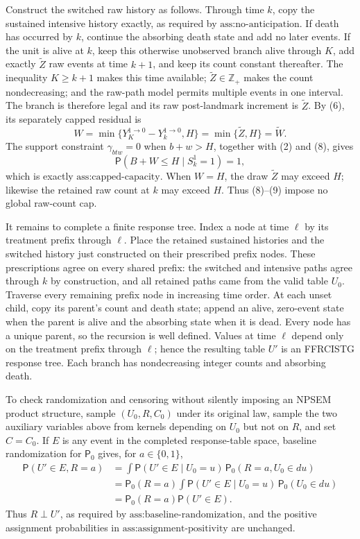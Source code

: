 Construct the switched raw history as follows. Through time \(k\), copy the sustained intensive history exactly, as required by \(\text{ass:no-anticipation}\). If death has occurred by \(k\), continue the absorbing death state and add no later events. If the unit is alive at \(k\), keep this otherwise unobserved branch alive through \(K\), add exactly \(\widetilde Z\) raw events at time \(k+1\), and keep its count constant thereafter. The inequality \(K\ge k+1\) makes this time available; \(\widetilde Z\in\mathbb Z_+\) makes the count nondecreasing; and the raw-path model permits multiple events in one interval. The branch is therefore legal and its raw post-landmark increment is \(\widetilde Z\). By (6), its separately capped residual is
\[
 W=\min\{Y_K^{1\to0}-Y_k^{1\to0},H\}
   =\min\{\widetilde Z,H\}=\widetilde W.                \tag{8}
\]
The support constraint \(\gamma_{btw}=0\) when \(b+w>H\), together with (2) and (8), gives
\[
 \mathsf P(B+W\le H\mid S_k^1=1)=1,                     \tag{9}
\]
which is exactly \(\text{ass:capped-capacity}\). When \(W=H\), the draw \(\widetilde Z\) may exceed \(H\); likewise the retained raw count at \(k\) may exceed \(H\). Thus (8)--(9) impose no global raw-count cap.

It remains to complete a finite response tree. Index a node at time \(\ell\) by its treatment prefix through \(\ell\). Place the retained sustained histories and the switched history just constructed on their prescribed prefix nodes. These prescriptions agree on every shared prefix: the switched and intensive paths agree through \(k\) by construction, and all retained paths came from the valid table \(U_0\). Traverse every remaining prefix node in increasing time order. At each unset child, copy its parent's count and death state; append an alive, zero-event state when the parent is alive and the absorbing state when it is dead. Every node has a unique parent, so the recursion is well defined. Values at time \(\ell\) depend only on the treatment prefix through \(\ell\); hence the resulting table \(U'\) is an FFRCISTG response tree. Each branch has nondecreasing integer counts and absorbing death.

To check randomization and censoring without silently imposing an NPSEM product structure, sample \((U_0,R,C_0)\) under its original law, sample the two auxiliary variables above from kernels depending on \(U_0\) but not on \(R\), and set \(C=C_0\). If \(E\) is any event in the completed response-table space, baseline randomization for \(\mathsf P_0\) gives, for \(a\in\{0,1\}\),
\[
 \begin{aligned}
 \mathsf P(U'\in E,R=a)
 &=\int \mathsf P(U'\in E\mid U_0=u)\,
       \mathsf P_0(R=a,U_0\in du)\\
 &=\mathsf P_0(R=a)\int \mathsf P(U'\in E\mid U_0=u)\,
       \mathsf P_0(U_0\in du)\\
 &=\mathsf P_0(R=a)\mathsf P(U'\in E).
 \end{aligned}                                           \tag{10}
\]
Thus \(R\perp U'\), as required by \(\text{ass:baseline-randomization}\), and the positive assignment probabilities in \(\text{ass:assignment-positivity}\) are unchanged.


